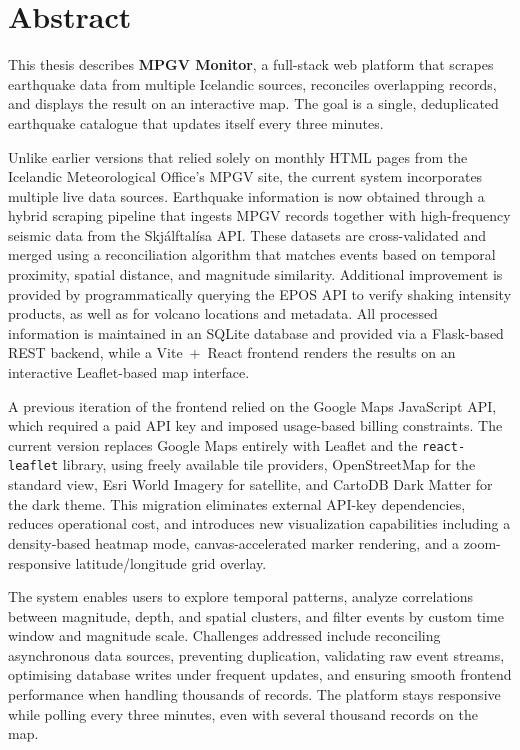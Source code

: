 \documentclass[12pt]{article}
\begin{document}
\clearpage
\null
\thispagestyle{empty} %
\newpage

\setcounter{page}{5}  %

\section*{\huge Abstract}
This thesis describes \textbf{MPGV Monitor}, a full-stack web platform that scrapes earthquake data from multiple Icelandic sources, reconciles overlapping records, and displays the result on an interactive map. The goal is a single, deduplicated earthquake catalogue that updates itself every three minutes.

Unlike earlier versions that relied solely on monthly HTML pages from the Icelandic Meteorological Office’s MPGV site, the current system incorporates multiple live data sources. Earthquake information is now obtained through a hybrid scraping pipeline that ingests MPGV records together with high-frequency seismic data from the Skjálftalísa API. These datasets are cross-validated and merged using a reconciliation algorithm that matches events based on temporal proximity, spatial distance, and magnitude similarity. Additional improvement is provided by programmatically querying the EPOS API to verify shaking intensity products, as well as for volcano locations and metadata. All processed information is maintained in an SQLite database and provided via a Flask-based REST backend, while a Vite~+~React frontend renders the results on an interactive Leaflet-based map interface.

A previous iteration of the frontend relied on the Google Maps JavaScript API, which required a paid API key and imposed usage-based billing constraints. The current version replaces Google Maps entirely with Leaflet and the \texttt{react-leaflet} library, using freely available tile providers, OpenStreetMap for the standard view, Esri World Imagery for satellite, and CartoDB Dark Matter for the dark theme. This migration eliminates external API-key dependencies, reduces operational cost, and introduces new visualization capabilities including a density-based heatmap mode, canvas-accelerated marker rendering, and a zoom-responsive latitude/longitude grid overlay.

The system enables users to explore temporal patterns, analyze correlations between magnitude, depth, and spatial clusters, and filter events by custom time window and magnitude scale. Challenges addressed include reconciling asynchronous data sources, preventing duplication, validating raw event streams, optimising database writes under frequent updates, and ensuring smooth frontend performance when handling thousands of records. The platform stays responsive while polling every three minutes, even with several thousand records on the map.
\end{document}

